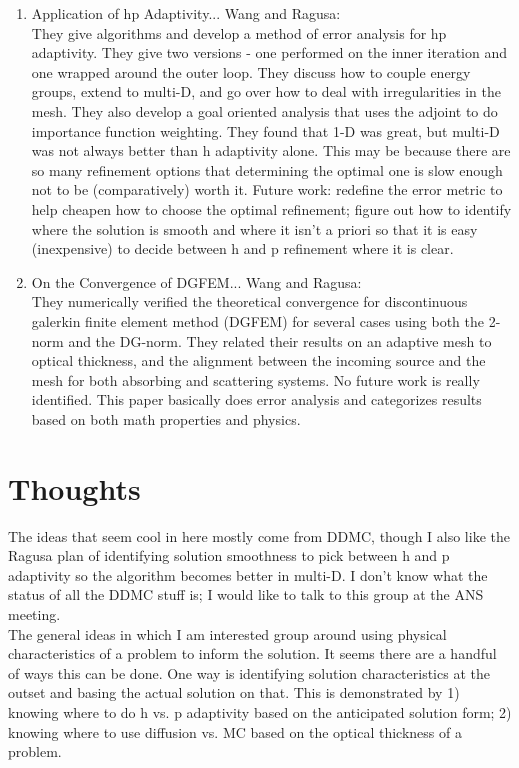 \documentclass[12pt,twoside]{article}
\begin{document}
\begin{enumerate}
\item Application of hp Adaptivity... Wang and Ragusa: \\
They give algorithms and develop a method of error analysis for hp adaptivity. They give two versions - one performed on the inner iteration and one wrapped around the outer loop. They discuss how to couple energy groups, extend to multi-D, and go over how to deal with irregularities in the mesh. They also develop a goal oriented analysis that uses the adjoint to do importance function weighting. They found that 1-D was great, but multi-D was not always better than h adaptivity alone. This may be because there are so many refinement options that determining the optimal one is slow enough not to be (comparatively) worth it. Future work: redefine the error metric to help cheapen how to choose the optimal refinement; figure out how to identify where the solution is smooth and where it isn't a priori so that it is easy (inexpensive) to decide between h and p refinement where it is clear. 

\item On the Convergence of DGFEM... Wang and Ragusa: \\
They numerically verified the theoretical convergence for discontinuous galerkin finite element method 
(DGFEM) for several cases using both the 2-norm and the DG-norm. They related their results on an adaptive mesh to optical thickness, and the alignment between the incoming source and the mesh for both absorbing and scattering systems. No future work is really identified. This paper basically does error analysis and categorizes results based on both math properties and physics. 
\end{enumerate}

\section{Thoughts}
The ideas that seem cool in here mostly come from DDMC, though I also like the Ragusa plan of identifying solution smoothness to pick between h and p adaptivity so the algorithm becomes better in multi-D. I don't know what the status of all the DDMC stuff is; I would like to talk to this group at the ANS meeting. \\

The general ideas in which I am interested group around using physical characteristics of a problem to inform the solution. It seems there are a handful of ways this can be done. One way is identifying solution characteristics at the outset and basing the actual solution on that. This is demonstrated by 1) knowing where to do h vs. p adaptivity based on the anticipated solution form; 2) knowing where to use diffusion vs. MC based on the optical thickness of a problem. \\
\end{document}
